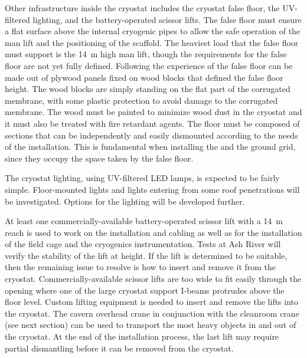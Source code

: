 Other infrastructure inside the cryostat includes the cryostat false floor, the UV-filtered lighting, and the battery-operated scissor lifts.
The false floor must ensure a flat surface above the internal cryogenic pipes to allow the safe operation of the man lift and the positioning of the scaffold.
The heaviest load that the false floor must support is the 14~m high man lift, though the requirements for the false floor are not yet fully defined.
Following the experience of  the false floor can be made out of plywood panels fixed on wood blocks that defined the false floor height.
The wood blocks are simply standing on the flat part of the corrugated membrane, with some plastic protection to avoid damage to the corrugated membrane.
The wood must be painted to minimize wood dust in the cryostat and it must also be treated with fire retardant agents.
The floor must be composed of sections that can be independently and easily dismounted according to the needs of the installation.
This is fundamental when installing the  and the ground grid, since they occupy the space taken by the false floor.

The cryostat lighting, using UV-filtered LED lamps, is expected to be fairly simple.
Floor-mounted lights and lights entering from some roof penetrations will be investigated.
Options for the lighting will be developed further.

At least one commercially-available battery-operated scissor lift with a 14~m reach is used to work on the  installation and cabling as well as for the installation of the field cage and the cryogenics instrumentation.
Tests at Ash River will verify the stability of the lift at height.
If the lift is determined to be suitable, then the remaining issue to resolve is how to insert and remove it from the cryostat.
Commercially-available scissor lifts are too wide to fit easily through the  opening where one of the large cryostat support I-beams protrudes above the floor level.
Custom lifting equipment is needed to insert and remove the lifts into the cryostat.
The cavern overhead crane in conjunction with the cleanroom crane (see next section) can be used to transport the most heavy objects in and out of the cryostat.
At the end of the installation process, the last lift may require partial dismantling before it can be removed from the cryostat.

